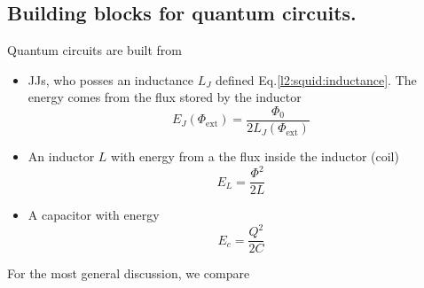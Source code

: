    \subsection{Building blocks for quantum circuits.}
   Quantum circuits are built from
   \begin{itemize}
   \item    JJs,    who    posses   an    inductance    $L_J$    defined
     Eq.\eqref{l2:squid:inductance}.   The energy  comes  from the  flux
     stored by the inductor
     \begin{equation}
       E_J(\Phi_\text{ext}) = \frac{\Phi_0}{2L_J(\Phi_\text{ext})}
     \end{equation}
   \item An inductor $L$ with energy from a the flux inside the inductor
     (coil)
     \begin{equation}
       E_L = \frac{\Phi^2}{2L}
     \end{equation}
   \item A capacitor with energy
     \begin{equation}
       E_c = \frac{Q^2}{2C}
     \end{equation}
   \end{itemize}

   For the most general discussion, we compare

